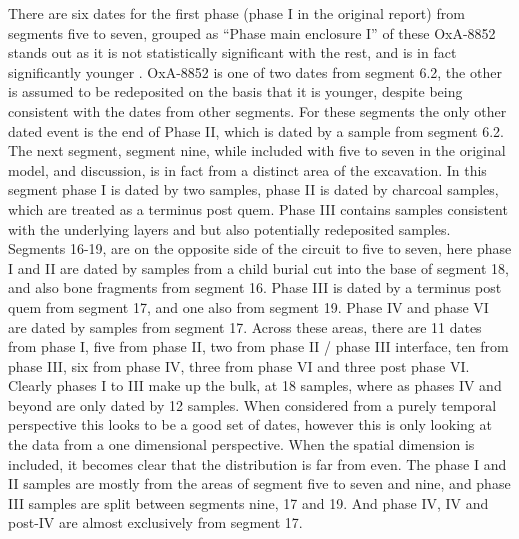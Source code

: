 There are six dates for the first phase (phase I in the original report) from segments five to seven, grouped as ``Phase main enclosure I'' \citep[139]{Whittle:2011kl} of these OxA-8852 stands out as it is not statistically significant with the rest, and is in fact significantly younger \citep[398]{Mercer:2008fk}. OxA-8852 is one of two dates from segment 6.2, the other is assumed to be redeposited on the basis that it is younger, despite being consistent with the dates from other segments. For these segments the only other dated event is the end of Phase II, which is dated by a sample from segment 6.2. The next segment, segment nine, while included with five to seven in the original model, and discussion, is in fact from a distinct area of the excavation. In this segment phase I is dated by two samples, phase II is dated by charcoal samples, which are treated as a terminus post quem. Phase III contains samples consistent with the underlying layers and but also potentially redeposited samples. Segments 16-19, are on the opposite side of the circuit to five to seven, here phase I and II are dated by samples from a child burial cut into the base of segment 18, and also bone fragments from segment 16. Phase III is dated by a terminus post quem from segment 17, and one also from segment 19. Phase IV and phase VI are dated by samples from segment 17. Across these areas, there are 11 dates from phase I, five from phase II, two from phase II / phase III interface, ten from phase III, six from phase IV, three from phase VI and three post phase VI. Clearly phases I to III make up the bulk, at 18 samples, where as phases IV and beyond are only dated by 12 samples. When considered from a purely temporal perspective this looks to be a good set of dates, however this is only looking at the data from a one dimensional perspective. When the spatial dimension is included, it becomes clear that the distribution is far from even. The phase I and II samples are mostly from the areas of segment five to seven and nine, and phase III samples are split between segments nine, 17 and 19. And phase IV, IV and post-IV are almost exclusively from segment 17.

